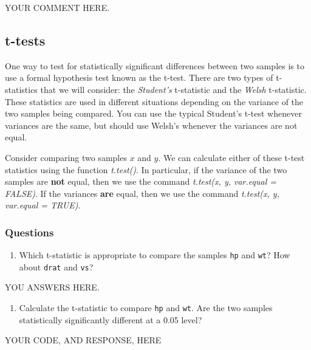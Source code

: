 \documentclass[
]{article}
\newenvironment{Shaded}{\begin{snugshade}}{\end{snugshade}}
\newcommand{\NormalTok}[1]{#1}
\providecommand{\tightlist}{%
  \setlength{\itemsep}{0pt}\setlength{\parskip}{0pt}}
\begin{document}
YOUR COMMENT HERE.

\hypertarget{t-tests}{%
\subsection{t-tests}\label{t-tests}}

One way to test for statistically significant differences between two
samples is to use a formal hypothesis test known as the t-test. There
are two types of t-statistics that we will consider: the
\emph{Student's} t-statistic and the \emph{Welsh} t-statistic. These
statistics are used in different situations depending on the variance of
the two samples being compared. You can use the typical Student's t-test
whenever variances are the same, but should use Welsh's whenever the
variances are not equal.

Consider comparing two samples \(x\) and \(y\). We can calculate either
of these t-test statistics using the function \emph{t.test()}. In
particular, if the variance of the two samples are \textbf{not} equal,
then we use the command \emph{t.test(x, y, var.equal = FALSE)}. If the
variances \textbf{are} equal, then we use the command \emph{t.test(x, y,
var.equal = TRUE)}.

\hypertarget{questions-4}{%
\subsubsection{Questions}\label{questions-4}}

\begin{enumerate}
\def\labelenumi{\arabic{enumi}.}
\tightlist
\item
  Which t-statistic is appropriate to compare the samples \texttt{hp}
  and \texttt{wt}? How about \texttt{drat} and \texttt{vs}?
\end{enumerate}

YOU ANSWERS HERE.

\begin{enumerate}
\def\labelenumi{\arabic{enumi}.}
\setcounter{enumi}{1}
\tightlist
\item
  Calculate the t-statistic to compare \texttt{hp} and \texttt{wt}. Are
  the two samples statistically significantly different at a 0.05 level?
\end{enumerate}

\begin{Shaded}
\begin{Highlighting}[]
\NormalTok{YOUR CODE, AND RESPONSE, HERE}
\end{Highlighting}
\end{Shaded}
\end{document}
